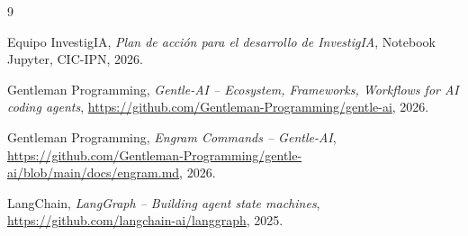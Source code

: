 \documentclass[12pt, a4paper]{article}
\begin{document}
\newpage
\begin{thebibliography}{9}

Equipo InvestigIA,
\textit{Plan de acción para el desarrollo de InvestigIA},
Notebook Jupyter, CIC-IPN, 2026.

Gentleman Programming,
\textit{Gentle-AI -- Ecosystem, Frameworks, Workflows for AI coding agents},
\url{https://github.com/Gentleman-Programming/gentle-ai},
2026.

Gentleman Programming,
\textit{Engram Commands -- Gentle-AI},
\url{https://github.com/Gentleman-Programming/gentle-ai/blob/main/docs/engram.md},
2026.

LangChain,
\textit{LangGraph -- Building agent state machines},
\url{https://github.com/langchain-ai/langgraph},
2025.

\end{thebibliography}
\end{document}
